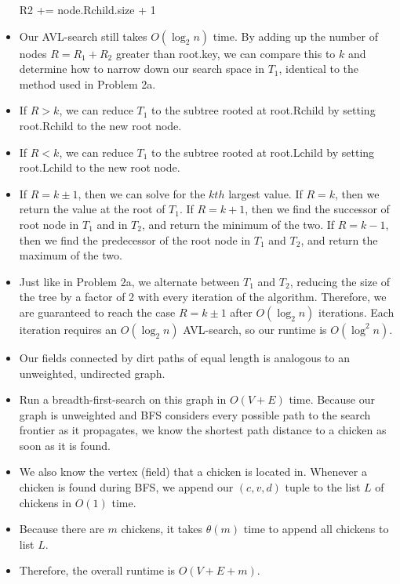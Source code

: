 \documentclass[12pt,twoside]{article}
\begin{document}
\begin{problems}
\begin{problemparts}
\begin{itemize}
R2 += node.Rchild.size + 1\\

\item Our AVL-search still takes $O(\log_2 n)$ time. By adding up the number of nodes $R = R_1+R_2$ greater than root.key, we can compare this to $k$ and determine how to narrow down our search space in $T_1$, identical to the method used in Problem 2a.
\end{itemize}


\begin{itemize}
\item If $R>k$, we can reduce $T_1$ to the subtree rooted at root.Rchild by setting root.Rchild to the new root node.
\item If $R<k$, we can reduce $T_1$ to the subtree rooted at root.Lchild by setting root.Lchild to the new root node.
\item If $R=k \pm 1$, then we can solve for the $kth$ largest value. If $R=k$, then we return the value at the root of $T_1$. If $R=k+1$, then we find the successor of root node in $T_1$ and in $T_2$, and return the minimum of the two. If $R=k-1$, then we find the predecessor of the root node in $T_1$ and $T_2$, and return the maximum of the two.


\item Just like in Problem 2a, we alternate between $T_1$ and $T_2$, reducing the size of the tree by a factor of 2 with every iteration of the algorithm. Therefore, we are guaranteed to reach the case $R=k \pm 1$ after $O(\log_2 n)$ iterations. Each iteration requires an $O(\log_2 n)$ AVL-search, so our runtime is $O(\log ^2 n)$.

\end{itemize}

\end{problemparts}

\problem  %

\begin{problemparts}
\problempart 

\begin{itemize}

\item Our fields connected by dirt paths of equal length is analogous to an unweighted, undirected graph. 
\item Run a breadth-first-search on this graph in $O(V+E)$ time. Because our graph is unweighted and BFS considers every possible path to the search frontier as it propagates, we know the shortest path distance to a chicken as soon as it is found.
\item We also know the vertex (field) that a chicken is located in. Whenever a chicken is found during BFS, we append our $(c, v, d)$ tuple to the list $L$ of chickens in $O(1)$ time.
\item Because there are $m$ chickens, it takes $\theta(m)$ time to append all chickens to list $L$.
\item Therefore, the overall runtime is $O(V+E+m)$.
\end{itemize}



\end{problemparts}
\end{problems}
\end{document}
